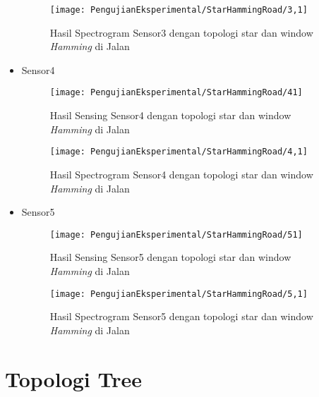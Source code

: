 \begin{itemize}
\begin{figure}[H]
	\centering
	\texttt{[image: PengujianEksperimental/StarHammingRoad/3,1]}
	\caption[Hasil Spectrogram Sensor3 dengan topologi star dan window {\it Hamming} di Jalan]{Hasil Spectrogram Sensor3 dengan topologi star dan window {\it Hamming} di Jalan} 
	\label{fig:hasilJalanStarHamm3,1}
\end{figure}

\item Sensor4
\begin{figure}[H]
	\centering
	\texttt{[image: PengujianEksperimental/StarHammingRoad/41]}
	\caption[Hasil Sensing Sensor4 dengan topologi star dan window {\it Hamming} di Jalan]{Hasil Sensing Sensor4 dengan topologi star dan window {\it Hamming} di Jalan} 
	\label{fig:hasilJalanStarHamm41}
\end{figure}

\begin{figure}[H]
	\centering
	\texttt{[image: PengujianEksperimental/StarHammingRoad/4,1]}
	\caption[Hasil Spectrogram Sensor4 dengan topologi star dan window {\it Hamming} di Jalan]{Hasil Spectrogram Sensor4 dengan topologi star dan window {\it Hamming} di Jalan} 
	\label{fig:hasilJalanStarHamm4,1}
\end{figure}

\item Sensor5
\begin{figure}[H]
	\centering
	\texttt{[image: PengujianEksperimental/StarHammingRoad/51]}
	\caption[Hasil Sensing Sensor5 dengan topologi star dan window {\it Hamming} di Jalan]{Hasil Sensing Sensor5 dengan topologi star dan window {\it Hamming} di Jalan} 
	\label{fig:hasilJalanStarHamm51}
\end{figure}

\begin{figure}[H]
	\centering
	\texttt{[image: PengujianEksperimental/StarHammingRoad/5,1]}
	\caption[Hasil Spectrogram Sensor5 dengan topologi star dan window {\it Hamming} di Jalan]{Hasil Spectrogram Sensor5 dengan topologi star dan window {\it Hamming} di Jalan} 
	\label{fig:hasilJalanStarHamm5,1}
\end{figure}
\end{itemize}

\section{Topologi Tree}
